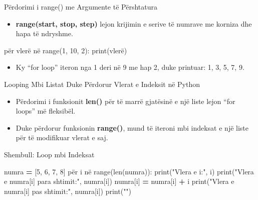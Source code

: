 \documentclass[
  ignorenonframetext,
]{beamer}
\newenvironment{Shaded}{\begin{snugshade}}{\end{snugshade}}
\newcommand{\BuiltInTok}[1]{#1}
\newcommand{\DecValTok}[1]{\textcolor[rgb]{0.00,0.00,0.81}{#1}}
\newcommand{\NormalTok}[1]{#1}
\newcommand{\OperatorTok}[1]{\textcolor[rgb]{0.81,0.36,0.00}{\textbf{#1}}}
\newcommand{\StringTok}[1]{\textcolor[rgb]{0.31,0.60,0.02}{#1}}
\providecommand{\tightlist}{%
  \setlength{\itemsep}{0pt}\setlength{\parskip}{0pt}}
\begin{document}
\begin{frame}[fragile]{Përdorimi i range() me Argumente të Përshtatura}
\protect\hypertarget{puxebrdorimi-i-range-me-argumente-tuxeb-puxebrshtatura}{}
\begin{itemize}
\tightlist
\item
  \textbf{range(start, stop, step)} lejon krijimin e serive të numrave
  me korniza dhe hapa të ndryshme.
\end{itemize}

\begin{Shaded}
\begin{Highlighting}[]
\NormalTok{për vlerë në }\BuiltInTok{range}\NormalTok{(}\DecValTok{1}\NormalTok{, }\DecValTok{10}\NormalTok{, }\DecValTok{2}\NormalTok{):}
    \BuiltInTok{print}\NormalTok{(vlerë)}
\end{Highlighting}
\end{Shaded}

\begin{itemize}
\tightlist
\item
  Ky ``for loop'' iteron nga 1 deri në 9 me hap 2, duke printuar: 1, 3,
  5, 7, 9.
\end{itemize}
\end{frame}

\begin{frame}{Looping Mbi Listat Duke Përdorur Vlerat e Indeksit në
Python}
\protect\hypertarget{looping-mbi-listat-duke-puxebrdorur-vlerat-e-indeksit-nuxeb-python}{}
\begin{itemize}
\item
  Përdorimi i funksionit \textbf{len()} për të marrë gjatësinë e një
  liste lejon ``for loops'' më fleksibël.
\item
  Duke përdorur funksionin \textbf{range()}, mund të iteroni mbi
  indeksat e një liste për të modifikuar vlerat e saj.
\end{itemize}
\end{frame}

\begin{frame}[fragile]{Shembull: Loop mbi Indeksat}
\protect\hypertarget{shembull-loop-mbi-indeksat}{}
\begin{Shaded}
\begin{Highlighting}[]
\NormalTok{numra }\OperatorTok{=}\NormalTok{ [}\DecValTok{5}\NormalTok{, }\DecValTok{6}\NormalTok{, }\DecValTok{7}\NormalTok{, }\DecValTok{8}\NormalTok{]}
\NormalTok{për i në }\BuiltInTok{range}\NormalTok{(}\BuiltInTok{len}\NormalTok{(numra)):}
    \BuiltInTok{print}\NormalTok{(}\StringTok{"Vlera e i:"}\NormalTok{, i)}
    \BuiltInTok{print}\NormalTok{(}\StringTok{"Vlera e numra[i] para shtimit:"}\NormalTok{, numra[i])}
\NormalTok{    numra[i] }\OperatorTok{=}\NormalTok{ numra[i] }\OperatorTok{+}\NormalTok{ i}
    \BuiltInTok{print}\NormalTok{(}\StringTok{"Vlera e numra[i] pas shtimit:"}\NormalTok{, numra[i])}
    \BuiltInTok{print}\NormalTok{(}\StringTok{""}\NormalTok{)}
\end{Highlighting}
\end{Shaded}
\end{frame}
\end{document}
